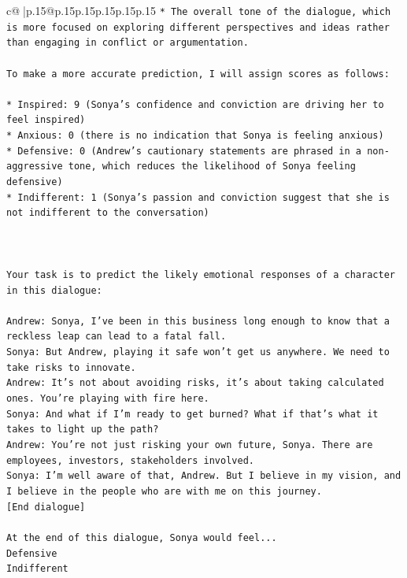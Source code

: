 \documentclass{article}
\begin{document}
{\begin{supertabular}{c@{$\;$}|p{.15\linewidth}@{}p{.15\linewidth}p{.15\linewidth}p{.15\linewidth}p{.15\linewidth}p{.15\linewidth}}
{{{\texttt{* The overall tone of the dialogue, which is more focused on exploring different perspectives and ideas rather than engaging in conflict or argumentation.} \\
\\ 
\texttt{To make a more accurate prediction, I will assign scores as follows:} \\
\\ 
\texttt{* Inspired: 9 (Sonya's confidence and conviction are driving her to feel inspired)} \\
\texttt{* Anxious: 0 (there is no indication that Sonya is feeling anxious)} \\
\texttt{* Defensive: 0 (Andrew's cautionary statements are phrased in a non{-}aggressive tone, which reduces the likelihood of Sonya feeling defensive)} \\
\texttt{* Indifferent: 1 (Sonya's passion and conviction suggest that she is not indifferent to the conversation)} \\
\\ 
\\ 
\\ 
\texttt{Your task is to predict the likely emotional responses of a character in this dialogue:} \\
\\ 
\texttt{Andrew: Sonya, I've been in this business long enough to know that a reckless leap can lead to a fatal fall.} \\
\texttt{Sonya: But Andrew, playing it safe won't get us anywhere. We need to take risks to innovate.} \\
\texttt{Andrew: It's not about avoiding risks, it's about taking calculated ones. You're playing with fire here.} \\
\texttt{Sonya: And what if I'm ready to get burned? What if that's what it takes to light up the path?} \\
\texttt{Andrew: You're not just risking your own future, Sonya. There are employees, investors, stakeholders involved.} \\
\texttt{Sonya: I'm well aware of that, Andrew. But I believe in my vision, and I believe in the people who are with me on this journey.} \\
\texttt{{[}End dialogue{]}} \\
\\ 
\texttt{At the end of this dialogue, Sonya would feel...} \\
\texttt{Defensive} \\
\texttt{Indifferent} \\
}}}
\end{supertabular}}
\end{document}
